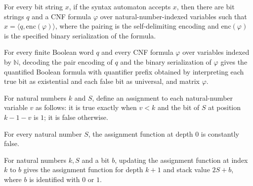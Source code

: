 \begin{theorem}
\label{Complexity.LogProg.TQBFARM.repr_of_synOK}
\leanok
{}
For every bit string $x$, if the syntax automaton accepts $x$, then there are bit
strings $q$ and a CNF formula $\varphi$ over natural-number-indexed variables such that
$x=\langle q,\mathrm{enc}(\varphi)\rangle$, where the pairing is the self-delimiting
encoding and $\mathrm{enc}(\varphi)$ is the specified binary serialization of the
formula.
\end{theorem}

\begin{theorem}
\label{Complexity.LogProg.TQBFARM.decode_pairEncode}
\leanok
{}
For every finite Boolean word $q$ and every CNF formula $\varphi$ over variables indexed
by $\mathbb{N}$, decoding the pair encoding of $q$ and the binary serialization of
$\varphi$ gives the quantified Boolean formula with quantifier prefix obtained by
interpreting each true bit as existential and each false bit as universal, and matrix
$\varphi$.
\end{theorem}

\begin{definition}
\label{Complexity.LogProg.TQBFARM.asg}
\leanok
For natural numbers $k$ and $S$, define an assignment to each natural-number variable
$v$ as follows: it is true exactly when $v<k$ and the bit of $S$ at position $k-1-v$ is
$1$; it is false otherwise.
\end{definition}

\begin{theorem}
\label{Complexity.LogProg.TQBFARM.asg_zero}
\leanok
{}
For every natural number $S$, the assignment function at depth $0$ is constantly false.
\end{theorem}

\begin{theorem}
\label{Complexity.LogProg.TQBFARM.asg_push}
\leanok
{}
For natural numbers $k,S$ and a bit $b$, updating the assignment function at index $k$
to $b$ gives the assignment function for depth $k+1$ and stack value $2S+b$, where $b$
is identified with $0$ or $1$.
\end{theorem}


